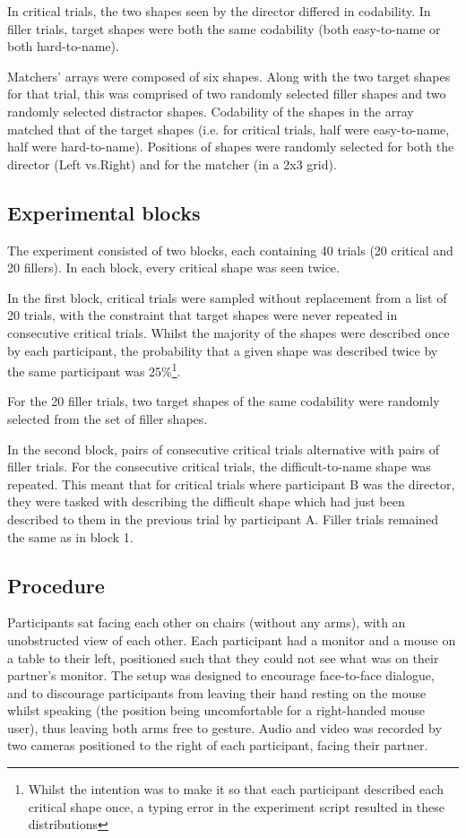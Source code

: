 \documentclass[a4paper,man,natbib]{apa6}
\begin{document}
In critical trials, the two shapes seen by the director differed in codability.
In filler trials, target shapes were both the same codability (both easy-to-name or both hard-to-name).

Matchers' arrays were composed of six shapes.
Along with the two target shapes for that trial, this was comprised of two randomly selected filler shapes and two randomly selected distractor shapes. 
Codability of the shapes in the array matched that of the target shapes (i.e. for critical trials, half were easy-to-name, half were hard-to-name).
Positions of shapes were randomly selected for both the director (Left vs.\@ Right) and for the matcher (in a 2x3 grid).


\subsection{Experimental blocks}

The experiment consisted of two blocks, each containing 40 trials (20 critical and 20 fillers). 
In each block, every critical shape was seen twice.

In the first block, critical trials were sampled without replacement from a list of 20 trials, with the constraint that target shapes were never repeated in consecutive critical trials.
Whilst the majority of the shapes were described once by each participant, the probability that a given shape was described twice by the same participant was 25\%\footnote{Whilst the intention was to make it so that each participant described each critical shape once, a typing error in the experiment script resulted in these distributions}. 

For the 20 filler trials, two target shapes of the same codability were randomly selected from the set of filler shapes.

In the second block, pairs of consecutive critical trials alternative with pairs of filler trials. 
For the consecutive critical trials, the difficult-to-name shape was repeated.
This meant that for critical trials where participant B was the director, they were tasked with describing the difficult shape which had just been described to them in the previous trial by participant A.
Filler trials remained the same as in block 1. 


\subsection{Procedure}
Participants sat facing each other on chairs (without any arms), with an unobstructed view of each other.
Each participant had a monitor and a mouse on a table to their left, positioned such that they could not see what was on their partner's monitor.
The setup was designed to encourage face-to-face dialogue, and to discourage participants from leaving their hand resting on the mouse whilst speaking (the position being uncomfortable for a right-handed mouse user), thus leaving both arms free to gesture.
Audio and video was recorded by two cameras positioned to the right of each participant, facing their partner.
\end{document}
